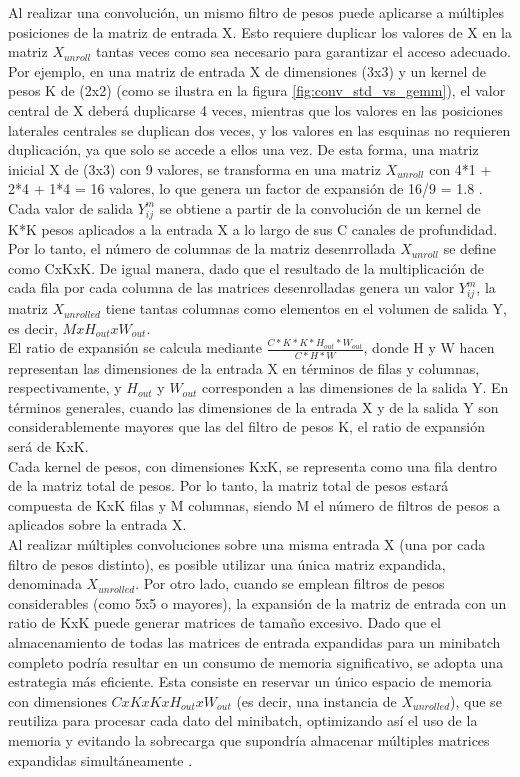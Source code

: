 Al realizar una convolución, un mismo filtro de pesos puede aplicarse a múltiples posiciones de la matriz de entrada X. Esto requiere duplicar los valores de X en la matriz $X_{unroll}$ tantas veces como sea necesario para garantizar el acceso adecuado. Por ejemplo, en una matriz de entrada X de dimensiones (3x3) y un kernel de pesos K de (2x2) (como se ilustra en la figura \ref{fig:conv_std_vs_gemm}), el valor central de X deberá duplicarse 4 veces, mientras que los valores en las posiciones laterales centrales se duplican dos veces, y los valores en las esquinas no requieren duplicación, ya que solo se accede a ellos una vez. De esta forma, una matriz inicial X de (3x3) con 9 valores, se transforma en una matriz $X_{unroll}$ con 4*1 + 2*4 + 1*4 = 16 valores, lo que genera un factor de expansión de 16/9 = 1.8 . \\
Cada valor de salida $Y^m_{ij}$ se obtiene a partir de la convolución de un kernel de K*K pesos aplicados a la entrada X a lo largo de sus C canales de profundidad. Por lo tanto, el número de columnas de la matriz desenrrollada $X_{unroll}$ se define como CxKxK. De igual manera, dado que el resultado de la multiplicación de cada fila por cada columna de las matrices desenrolladas genera un valor $Y^m_{ij}$, la matriz $X_{unrolled}$ tiene tantas columnas como elementos en el volumen de salida Y, es decir, $MxH_{out}xW_{out}$. \\
El ratio de expansión se calcula mediante $\frac{C*K*K*H_{out}*W_{out}}{C*H*W}$, donde H y W hacen representan las dimensiones de la entrada X en términos de filas y columnas, respectivamente, y $H_{out}$ y $W_{out}$ corresponden a las dimensiones de la salida Y. En términos generales, cuando las dimensiones de la entrada X y de la salida Y son considerablemente mayores que las del filtro de pesos K, el ratio de expansión será de KxK. \\
Cada kernel de pesos, con dimensiones KxK, se representa como una fila dentro de la matriz total de pesos. Por lo tanto, la matriz total de pesos estará compuesta de KxK filas y M columnas, siendo M el número de filtros de pesos a aplicados sobre la entrada X. \\
Al realizar múltiples convoluciones sobre una misma entrada X (una por cada filtro de pesos distinto), es posible utilizar una única matriz expandida, denominada $X_{unrolled}$. Por otro lado, cuando se emplean filtros de pesos considerables (como 5x5 o mayores), la expansión de la matriz de entrada con un ratio de KxK puede generar matrices de tamaño excesivo. Dado que el almacenamiento de todas las matrices de entrada expandidas para un minibatch completo podría resultar en un consumo de memoria significativo, se adopta una estrategia más eficiente. Esta consiste en reservar un único espacio de memoria con dimensiones $CxKxKxH_{out}xW_{out}$ (es decir, una instancia de $X_{unrolled}$), que se reutiliza para procesar cada dato del minibatch, optimizando así el uso de la memoria y evitando la sobrecarga que supondría almacenar múltiples matrices expandidas simultáneamente \cite{Programming_Massively}.


